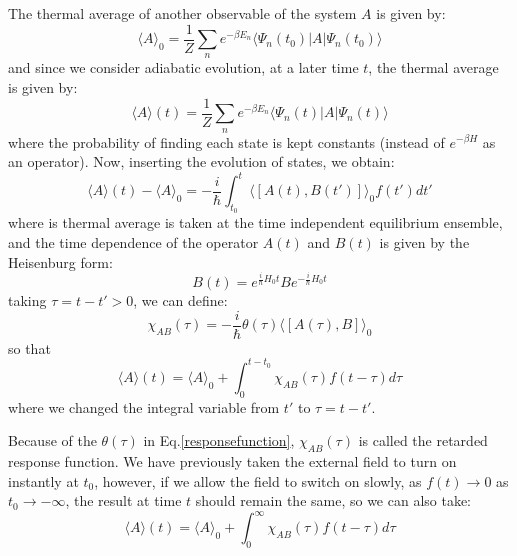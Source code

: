 \documentclass{article}
\begin{document}
The thermal average of another observable of the system $A$ is given by:
\begin{equation}
    \langle A\rangle_0 = \frac{1}{Z} \sum_n e^{-\beta E_n} \langle \Psi_n(t_0) | A | \Psi_n(t_0) \rangle 
\end{equation}
and since we consider adiabatic evolution, at a later time $t$, the thermal average is 
given by:
\begin{equation}
    \langle A\rangle(t) = \frac{1}{Z} \sum_n e^{-\beta E_n} \langle \Psi_n(t) | A | \Psi_n(t) \rangle 
\end{equation}
where the probability of finding each state is kept constants (instead of $e^{-\beta H}$ as an operator).
Now, inserting the evolution of states, we obtain:
\begin{equation}
    \langle A\rangle(t) - \langle A\rangle_0 = -\frac{i}{\hbar} \int_{t_0}^{t} \langle [ A(t), B(t') ] \rangle_0 f(t') dt'
\end{equation} 
where is thermal average is taken at the time independent equilibrium ensemble, and the time dependence of
the operator $A(t)$ and $B(t)$ is given by the Heisenburg form:
\begin{equation}
    B(t) = e^{\frac{i}{\hbar}H_0t} B e^{-\frac{i}{\hbar}H_0t}
\end{equation}
taking $\tau = t - t' > 0$, we can define:
\begin{equation}
    \chi_{AB}(\tau) = -\frac{i}{\hbar} \theta(\tau) \langle [ A(\tau), B ] \rangle_0 \label{responsefunction}
\end{equation}
so that 
\begin{equation}
    \langle A\rangle(t) = \langle A\rangle_0 + \int_{0}^{t-t_0} \chi_{AB}(\tau) f(t - \tau) d\tau
\end{equation} 
where we changed the integral variable from $t'$ to $\tau = t - t'$. 

Because of the $\theta(\tau)$ in Eq.\ref{responsefunction}, $\chi_{AB}(\tau)$ is called the retarded response function.
We have previously taken the external field to turn on instantly at $t_0$, however, if we allow the field to switch on
slowly, as $f(t) \to 0$ as $t_0 \to -\infty$, the result at time $t$ should remain the same, so we 
can also take:
\begin{equation}
    \langle A\rangle(t) = \langle A\rangle_0 + \int_{0}^{\infty} \chi_{AB}(\tau) f(t - \tau) d\tau \label{response}
\end{equation} 
\end{document}
